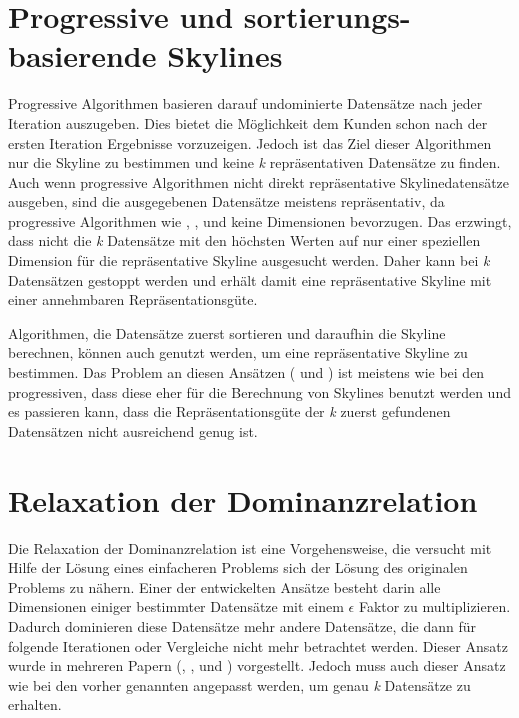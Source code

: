 \section{Progressive und sortierungs-basierende Skylines}
\label{ch:Forschungsstand:sec:progSortSky}
Progressive Algorithmen basieren darauf undominierte Datensätze nach jeder Iteration auszugeben. Dies bietet die Möglichkeit dem Kunden schon nach der ersten Iteration Ergebnisse vorzuzeigen. Jedoch ist das Ziel dieser Algorithmen nur die Skyline zu bestimmen und keine \textit{k} repräsentativen Datensätze zu finden.
Auch wenn progressive Algorithmen nicht direkt repräsentative Skylinedatensätze ausgeben, sind die ausgegebenen Datensätze meistens repräsentativ, da progressive Algorithmen wie \cite{Tan:2001:EPS:645927.672217}, \cite{papadias2005progressive}, \cite{Kossmann:2002:SSS:1287369.1287394} und \cite{Papadias:2003:OPA:872757.872814} keine Dimensionen bevorzugen. Das erzwingt, dass nicht die \textit{k} Datensätze mit den höchsten Werten auf nur einer speziellen Dimension für die repräsentative Skyline ausgesucht werden. Daher kann bei \textit{k} Datensätzen gestoppt werden und erhält damit eine repräsentative Skyline mit einer annehmbaren Repräsentationsgüte.

Algorithmen, die Datensätze zuerst sortieren und daraufhin die Skyline berechnen, können auch genutzt werden, um eine repräsentative Skyline zu bestimmen. Das Problem an diesen Ansätzen (\cite{1260846} und \cite{lee2010z}) ist meistens wie bei den progressiven, dass diese eher für die Berechnung von Skylines benutzt werden und es passieren kann, dass die Repräsentationsgüte der \textit{k} zuerst gefundenen Datensätzen nicht ausreichend genug ist.
\section{Relaxation der Dominanzrelation}
\label{ch:Forschungsstand:sec:relaxDomRel}
Die Relaxation der Dominanzrelation ist eine Vorgehensweise, die versucht mit Hilfe der Lösung eines einfacheren Problems sich der Lösung des originalen Problems zu nähern. 
Einer der entwickelten Ansätze besteht darin alle Dimensionen einiger bestimmter Datensätze mit einem $\epsilon$ Faktor zu multiplizieren. Dadurch dominieren diese Datensätze mehr andere Datensätze, die dann für folgende Iterationen oder Vergleiche nicht mehr betrachtet werden. Dieser Ansatz wurde in mehreren Papern (\cite{Koltun05approximatelydominating}, \cite{Su:2007:AMA:1418332.1418454}, \cite{Vassilvitskii:2005:ECS:1132633.1132648} und \cite{Xia:2008:SFD:1546682.1547149}) vorgestellt. Jedoch muss auch dieser Ansatz wie bei den vorher genannten angepasst werden, um genau \textit{k} Datensätze zu erhalten.

